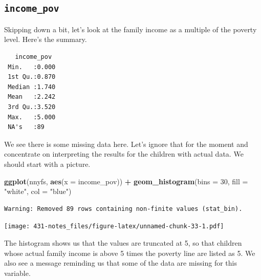 \documentclass[
]{book}
\newenvironment{Shaded}{\begin{snugshade}}{\end{snugshade}}
\newcommand{\DataTypeTok}[1]{\textcolor[rgb]{0.13,0.29,0.53}{#1}}
\newcommand{\DecValTok}[1]{\textcolor[rgb]{0.00,0.00,0.81}{#1}}
\newcommand{\KeywordTok}[1]{\textcolor[rgb]{0.13,0.29,0.53}{\textbf{#1}}}
\newcommand{\NormalTok}[1]{#1}
\newcommand{\OperatorTok}[1]{\textcolor[rgb]{0.81,0.36,0.00}{\textbf{#1}}}
\newcommand{\StringTok}[1]{\textcolor[rgb]{0.31,0.60,0.02}{#1}}
\begin{document}
\hypertarget{income_pov}{%
\subsection{\texorpdfstring{\texttt{income\_pov}}{income\_pov}}\label{income_pov}}

Skipping down a bit, let's look at the family income as a multiple of the poverty level. Here's the summary.

\begin{Shaded}
\end{Shaded}

\begin{verbatim}
   income_pov   
 Min.   :0.000  
 1st Qu.:0.870  
 Median :1.740  
 Mean   :2.242  
 3rd Qu.:3.520  
 Max.   :5.000  
 NA's   :89     
\end{verbatim}

We see there is some missing data here. Let's ignore that for the moment and concentrate on interpreting the results for the children with actual data. We should start with a picture.

\begin{Shaded}
\begin{Highlighting}[]
\KeywordTok{ggplot}\NormalTok{(nnyfs, }\KeywordTok{aes}\NormalTok{(}\DataTypeTok{x =}\NormalTok{ income_pov)) }\OperatorTok{+}
\StringTok{  }\KeywordTok{geom_histogram}\NormalTok{(}\DataTypeTok{bins =} \DecValTok{30}\NormalTok{, }\DataTypeTok{fill =} \StringTok{"white"}\NormalTok{, }\DataTypeTok{col =} \StringTok{"blue"}\NormalTok{)}
\end{Highlighting}
\end{Shaded}

\begin{verbatim}
Warning: Removed 89 rows containing non-finite values (stat_bin).
\end{verbatim}

\texttt{[image: 431-notes\_files/figure-latex/unnamed-chunk-33-1.pdf]}

The histogram shows us that the values are truncated at 5, so that children whose actual family income is above 5 times the poverty line are listed as 5. We also see a message reminding us that some of the data are missing for this variable.
\end{document}
